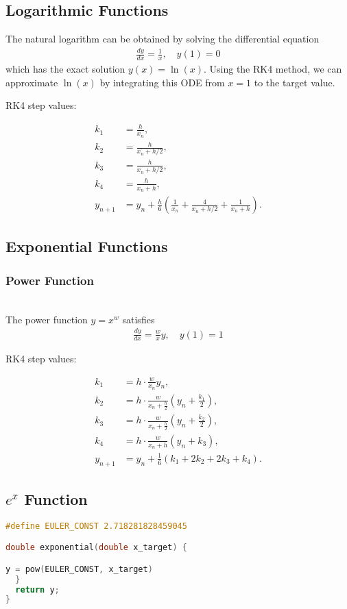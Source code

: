 \documentclass[conference]{IEEEtran}
\begin{document}
\subsection{Logarithmic Functions}

The natural logarithm can be obtained by solving the differential equation \cite{ncert12}
\begin{align}
\frac{dy}{dx} = \frac{1}{x}, \quad y(1)=0
\end{align}
which has the exact solution $y(x)=\ln(x)$. Using the RK4 method, we can approximate $\ln(x)$ by integrating this ODE from $x=1$ to the target value.

RK4 step values:

\begin{align}
k_1 &= \frac{h}{x_n}, \\
k_2 &= \frac{h}{x_n+h/2}, \\
k_3 &= \frac{h}{x_n+h/2}, \\
k_4 &= \frac{h}{x_n+h}, \\
y_{n+1} &= y_n+\frac{h}{6}\left(\frac{1}{x_n}+\frac{4}{x_n+h/2}+\frac{1}{x_n+h}\right).
\end{align}

\subsection{Exponential Functions}

\subsubsection{Power Function} \\
The power function $y=x^w$ \cite{ncert12} satisfies
\begin{align}
\frac{dy}{dx} = \frac{w}{x}y, \quad y(1)=1
\end{align}

RK4 step values:

\begin{align}
k_1 &= h \cdot \frac{w}{x_n}y_n, \\
k_2 &= h \cdot \frac{w}{x_n+\tfrac{h}{2}}\left(y_n+\tfrac{k_1}{2}\right), \\
k_3 &= h \cdot \frac{w}{x_n+\tfrac{h}{2}}\left(y_n+\tfrac{k_2}{2}\right), \\
k_4 &= h \cdot \frac{w}{x_n+h}\left(y_n+k_3\right), \\
y_{n+1} &= y_n+\tfrac{1}{6}(k_1+2k_2+2k_3+k_4).
\end{align}

\subsection{$e^x$ Function}
\begin{lstlisting}[language=C, caption={C Implementation of Exponential Function}]
#define EULER_CONST 2.718281828459045

double exponential(double x_target) {

y = pow(EULER_CONST, x_target)
  }
  return y;
}
\end{lstlisting}
\end{document}
